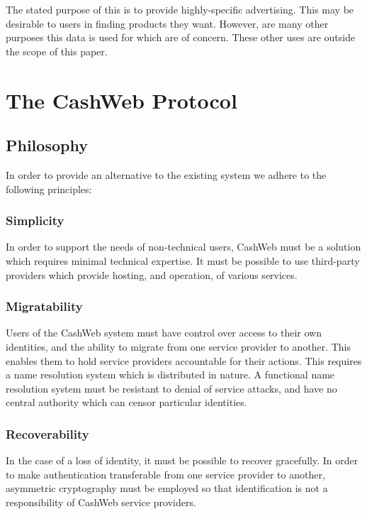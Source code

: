 \documentclass{article}
\begin{document}
The stated purpose of this is to provide highly-specific advertising. This may be desirable to users in finding products they want. However, are many other purposes this data is used for which are of concern. These other uses are outside the scope of this paper.

\section{The CashWeb Protocol}

\subsection{Philosophy}

In order to provide an alternative to the existing system we adhere to the following principles:

\subsubsection{Simplicity}

In order to support the needs of non-technical users, CashWeb must be a solution which requires minimal technical expertise. It must be possible to use third-party providers which provide hosting, and operation, of various services.

\subsubsection{Migratability}

Users of the CashWeb system must have control over access to their own identities, and the ability to migrate from one service provider to another. This enables them to hold service providers accountable for their actions. This requires a name resolution system which is distributed in nature. A functional name resolution system must be resistant to denial of service attacks, and have no central authority which can censor particular identities.

\subsubsection{Recoverability}

In the case of a loss of identity, it must be possible to recover gracefully. In order to make authentication transferable from one service provider to another, asymmetric cryptography must be employed so that identification is not a responsibility of CashWeb service providers.
\end{document}
